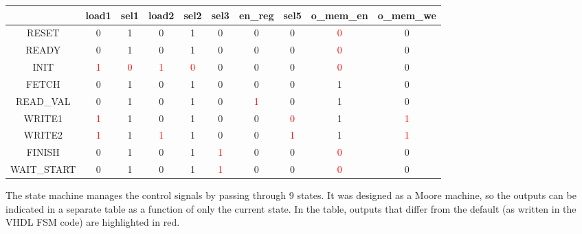 \documentclass{article}
\begin{document}
\begin{table}[htbp]
\centering
\begin{tabular}{|c|*{9}{c|}}
\hline
& load1 & sel1 & load2 & sel2 & sel3 & en\_reg& sel5 & o\_mem\_en & o\_mem\_we \\
\hline
RESET & 0 & 1 & 0 & 1 & 0 & 0 & 0 & \textcolor{red}{0} & 0 \\
\hline
READY & 0 & 1 & 0 & 1 & 0 & 0 & 0 & \textcolor{red}{0} & 0 \\
\hline
INIT & \textcolor{red}{1} & \textcolor{red}{0} & \textcolor{red}{1} & \textcolor{red}{0} & 0 & 0 & 0 & \textcolor{red}{0} & 0 \\
\hline
FETCH & 0 & 1 & 0 & 1 & 0 & 0 & 0 & 1 & 0 \\
\hline
READ\_VAL & 0 & 1 & 0 & 1 & 0 & \textcolor{red}{1} & 0 & 1 & 0 \\
\hline
WRITE1 & \textcolor{red}{1} & 1 & 0 & 1 & 0 & 0 & \textcolor{red}{0} & 1 & \textcolor{red}{1} \\
\hline
WRITE2 & \textcolor{red}{1} & 1 & \textcolor{red}{1} & 1 & 0 & 0 & \textcolor{red}{1} & 1 & \textcolor{red}{1} \\
\hline
FINISH & 0 & 1 & 0 & 1 & \textcolor{red}{1} & 0 & 0 & \textcolor{red}{0} & 0 \\
\hline
WAIT\_START & 0 & 1 & 0 & 1 & \textcolor{red}{1} & 0 & 0 & \textcolor{red}{0} & 0 \\
\hline
\end{tabular}
\label{tab:Uscite della FSM}
\end{table}
The state machine manages the control signals by passing through 9 states. It was designed as a Moore machine, so the outputs can be indicated in a separate table as a function of only the current state. In the table, outputs that differ from the default (as written in the VHDL FSM code) are highlighted in red.
\end{document}
